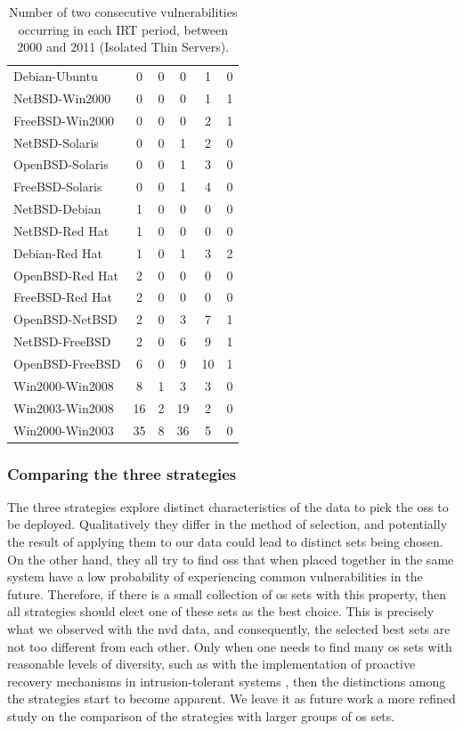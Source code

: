 \begin{table}[!ht]
\begin{center}
{\begin{tabular}{|l||c c c c c|}
Debian-Ubuntu & 0 & 0 & 0 & 1 & 0 \\
NetBSD-Win2000 & 0 & 0 & 0 & 1 & 1 \\
FreeBSD-Win2000 & 0 & 0 & 0 & 2 & 1 \\ \hline
NetBSD-Solaris & 0 & 0 & 1 & 2 & 0 \\
OpenBSD-Solaris & 0 & 0 & 1 & 3 & 0 \\
FreeBSD-Solaris & 0 & 0 & 1 & 4 & 0 \\ \hline
NetBSD-Debian & 1 & 0 & 0 & 0 & 0  \\
NetBSD-Red Hat & 1 & 0 & 0 & 0 & 0 \\
Debian-Red Hat & 1 & 0 & 1 & 3 & 2 \\
OpenBSD-Red Hat & 2 & 0 & 0 & 0 & 0 \\
FreeBSD-Red Hat & 2 & 0 & 0 & 0 & 0 \\
OpenBSD-NetBSD & 2 & 0 & 3 & 7 & 1 \\
NetBSD-FreeBSD & 2 & 0 & 6 & 9 & 1 \\
OpenBSD-FreeBSD & 6 & 0 & 9 & 10 &  1\\
Win2000-Win2008 & 8 & 1 & 3 & 3 & 0 \\
Win2003-Win2008 & 16 & 2 & 19 & 2 & 0 \\
Win2000-Win2003 & 35 & 8 & 36 & 5 & 0\\ \hline
\end{tabular}
\caption{Number of two consecutive vulnerabilities occurring in each IRT period, between 2000 and 2011 (Isolated Thin Servers).}
\label{tab:pairs_irt_iso}
}
\end{center}
\end{table}

\subsubsection*{Comparing the three strategies}
The three strategies explore distinct characteristics of the data to pick the \glspl{os} to be deployed. 
Qualitatively they differ in the method of selection, and potentially the result of applying them to our data could lead to distinct sets being chosen.
On the other hand, they all try to find \glspl{os} that when placed together in the same system have a low probability of experiencing common vulnerabilities in the future. 
Therefore, if there is a small collection of \gls{os} sets with this property, then all strategies should elect one of these sets as the best choice. 
This is precisely what we observed with the \gls{nvd} data, and consequently, the selected best sets are not too different from each other.
Only when one needs to find many \gls{os} sets with reasonable levels of diversity, such as with the implementation of proactive recovery mechanisms in intrusion-tolerant systems \cite{Castro:2002,Sousa:2010}, then the distinctions among the strategies start to become apparent.
We leave it as future work a more refined study on the comparison of the strategies with larger groups of \gls{os} sets.

